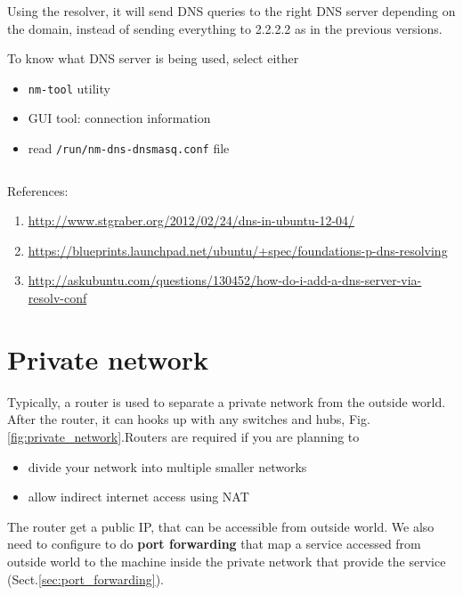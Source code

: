 Using the resolver, it will send DNS queries to the right DNS server depending
on the domain, instead of sending everything to 2.2.2.2 as in the previous
versions. 

To know what DNS server is being used, select either
\begin{itemize}
  \item \verb!nm-tool! utility
  \item GUI tool: connection information
  \item read \verb!/run/nm-dns-dnsmasq.conf! file
\end{itemize}
\begin{verbatim}

\end{verbatim}



References:
\begin{enumerate}
  \item \url{http://www.stgraber.org/2012/02/24/dns-in-ubuntu-12-04/}
  \item
  \url{https://blueprints.launchpad.net/ubuntu/+spec/foundations-p-dns-resolving}
  \item
  \url{http://askubuntu.com/questions/130452/how-do-i-add-a-dns-server-via-resolv-conf}
\end{enumerate}

\section{Private network}
\label{sec:private_network}

Typically, a router is used to separate a private network from the outside
world. After the router, it can hooks up with any switches and hubs,
Fig.\ref{fig:private_network}.Routers are required if you
are planning to
\begin{itemize}
  \item divide your network into multiple smaller networks
  \item allow indirect internet access using NAT
\end{itemize}
The router get a public IP, that can be accessible from outside world. We also
need to configure to do {\bf port forwarding} that map a service accessed from
outside world to the machine inside the private network that provide the
service (Sect.\ref{sec:port_forwarding}). 


